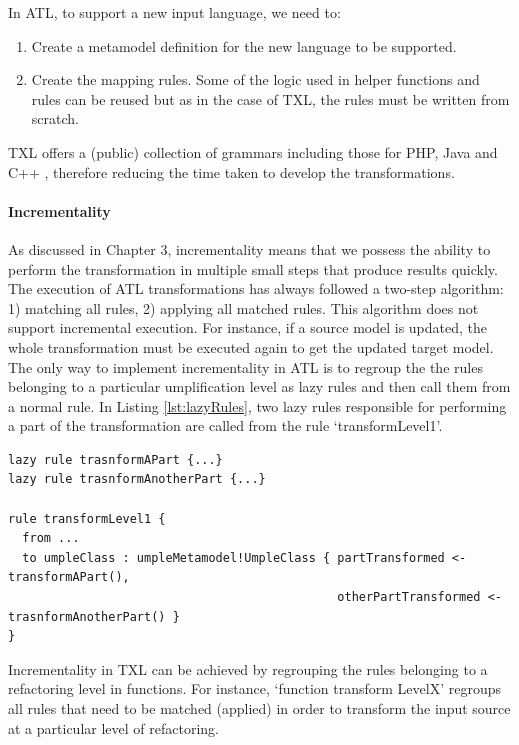 In ATL, to support a new input language, we need to:
\begin{enumerate}
\item Create a metamodel definition for the new language to be supported.
\item Create the mapping rules. Some of the logic used in helper functions and rules can be reused but as in the case of TXL, the rules must be written from scratch.
\end{enumerate}

TXL offers a (public) collection of grammars including those for PHP, Java and C++ \cite{txlresources}, therefore reducing the time taken to develop the transformations. 

\paragraph*{Incrementality} 

As discussed in Chapter 3, incrementality means that we possess the ability to perform the transformation in multiple small steps that produce  results quickly. The execution of ATL transformations has always followed a two-step algorithm: 1) matching all rules, 2) applying all matched rules. This algorithm does not support incremental execution. For instance, if a source model is updated, the whole transformation must be executed again to get the updated target model. The only way to implement incrementality in ATL is to regroup the 
the rules belonging to a particular umplification level as lazy rules and then call them from a normal rule. In Listing \ref{lst:lazyRules}, two lazy rules responsible for performing a part of the transformation are called from the rule `transformLevel1'.

\begin{lstlisting}[style=umplePlain, label=lst:lazyRules, caption=Calling Lazy Rules] 
lazy rule trasnformAPart {...}
lazy rule trasnformAnotherPart {...}

rule transformLevel1 {
  from ...
  to umpleClass : umpleMetamodel!UmpleClass { partTransformed <- transformAPart(),
                                              otherPartTransformed <- trasnformAnotherPart() }
}
\end{lstlisting}

Incrementality in TXL can be achieved  by regrouping the rules belonging to a refactoring level in functions. For instance, `function transform LevelX' regroups all rules that need to be matched (applied) in order to transform the input source at a particular level of refactoring. 

